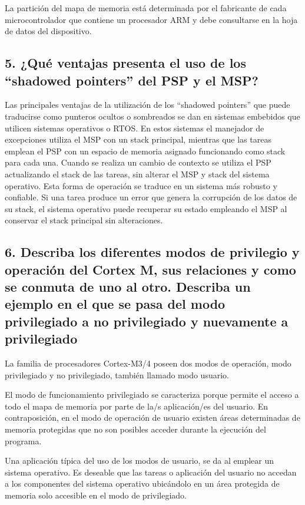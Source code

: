 \documentclass[10pt,a4paper,twoside,spanish]{article}	%
\begin{document}
La partición del mapa de memoria está determinada por el fabricante de cada microcontrolador que contiene un procesador ARM y debe consultarse en la hoja de datos del dispositivo.

\subsection*{5. ¿Qué ventajas presenta el uso de los “shadowed pointers” del PSP y el MSP?}

Las principales ventajas de la utilización de los “shadowed pointers” que puede traducirse como punteros ocultos o sombreados se dan en sistemas embebidos que utilicen sistemas operativos o RTOS. En estos sistemas el manejador de excepciones utiliza el MSP con un stack principal, mientras que las tareas emplean el PSP con un espacio de memoria asignado funcionando como stack para cada una. Cuando se realiza un cambio de contexto se utiliza el PSP  actualizando el stack de las tareas, sin alterar el MSP y stack del sistema operativo.
Esta forma de operación se traduce en un sistema más robusto y confiable. Si una tarea produce un error que genera la corrupción de los datos de su stack, el sistema operativo puede recuperar su estado empleando el MSP al conservar el stack principal sin alteraciones.


\subsection*{6. Describa los diferentes modos de privilegio y operación del Cortex M, sus relaciones y como se conmuta de uno al otro. Describa un ejemplo en el que se pasa del modo privilegiado a no privilegiado y nuevamente a privilegiado}

La familia de procesadores Cortex-M3/4 poseen dos modos de operación, modo privilegiado y no privilegiado, también llamado modo usuario.

El modo de funcionamiento privilegiado se caracteriza porque permite el acceso a todo el mapa de memoria por parte de la/s aplicación/es del usuario. En contraposición, en el modo de operación de usuario existen áreas determinadas de memoria protegidas que no son posibles acceder durante la ejecución del programa.

Una aplicación típica del uso de los modos de usuario, se da al emplear un sistema operativo. Es deseable que las tareas o aplicación del usuario no accedan a los componentes del sistema operativo ubicándolo en un área protegida de memoria solo accesible en el modo de privilegiado.     
\end{document}
